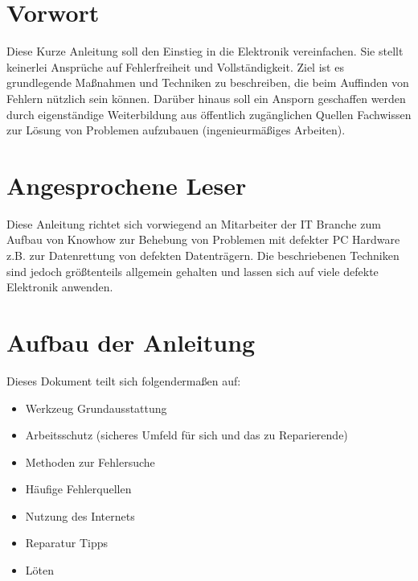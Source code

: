 \section{Vorwort}

Diese Kurze Anleitung soll den Einstieg in die Elektronik vereinfachen.
Sie stellt keinerlei Ansprüche auf Fehlerfreiheit und Vollständigkeit.
Ziel ist es grundlegende Maßnahmen und Techniken zu beschreiben, die beim Auffinden von Fehlern nützlich sein können.
Darüber hinaus soll ein Ansporn geschaffen werden durch eigenständige Weiterbildung aus öffentlich zugänglichen Quellen Fachwissen zur Lösung von Problemen aufzubauen (ingenieurmäßiges Arbeiten).


\section{Angesprochene Leser}

Diese Anleitung richtet sich vorwiegend an Mitarbeiter der IT Branche zum Aufbau von Knowhow zur Behebung von Problemen mit defekter PC Hardware z.B. zur Datenrettung von defekten Datenträgern.
Die beschriebenen Techniken sind jedoch größtenteils allgemein gehalten und lassen sich auf viele defekte Elektronik anwenden.

\section{Aufbau der Anleitung}

Dieses Dokument teilt sich folgendermaßen auf:
\begin{itemize}
	\item Werkzeug Grundausstattung
	\item Arbeitsschutz (sicheres Umfeld für sich und das zu Reparierende)
	\item Methoden zur Fehlersuche
	\item Häufige Fehlerquellen
	\item Nutzung des Internets
	\item Reparatur Tipps
	\item Löten
\end{itemize}